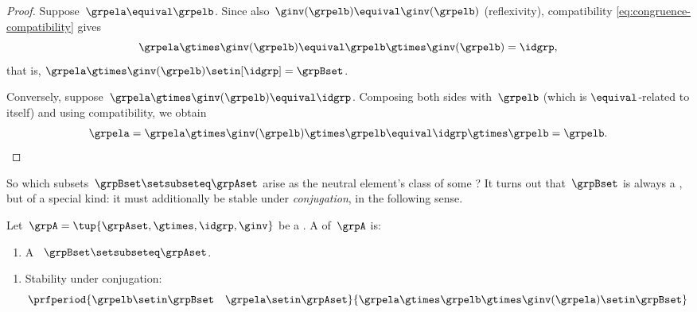 \begin{proof}
    Suppose~$\grpela \equival \grpelb$.
    Since also~$\ginv(\grpelb) \equival \ginv(\grpelb)$ (reflexivity), compatibility \cref{eq:congruence-compatibility} gives
    \begin{equation}
        \grpela \gtimes \ginv(\grpelb) \equival \grpelb \gtimes \ginv(\grpelb) = \idgrp,
    \end{equation}
    that is, $\grpela \gtimes \ginv(\grpelb) \setin [\idgrp] = \grpBset$.

    Conversely, suppose~$\grpela \gtimes \ginv(\grpelb) \equival \idgrp$.
    Composing both sides with~$\grpelb$ (which is $\equival$-related to itself) and using compatibility, we obtain
    \begin{equation}
        \grpela = \grpela \gtimes \ginv(\grpelb) \gtimes \grpelb \equival \idgrp \gtimes \grpelb = \grpelb.
        \qedhere
    \end{equation}
\end{proof}

So which subsets~$\grpBset \setsubseteq \grpAset$ arise as the neutral element's class of some ?
It turns out that~$\grpBset$ is always a , but of a special kind: it must additionally be stable under \emph{conjugation}, in the following sense.

\begin{ctdefinition}
    \label{def:normal-subgroup}
    Let~$\grpA = \tup{\grpAset, \gtimes, \idgrp, \ginv}$ be a .
    A  of~$\grpA$ is:

    \constit

    \begin{enumerate}
        \item A ~$\grpBset \setsubseteq \grpAset$.
    \end{enumerate}

    \condit

    \begin{enumerate}
        \item Stability under conjugation:
              \begin{equation}
                  \label{eq:normality}
                  \prfperiod{
                      \grpelb \setin \grpBset \quad \grpela \setin \grpAset
                  }{
                      \grpela \gtimes \grpelb \gtimes \ginv(\grpela) \setin \grpBset
                  }
              \end{equation}
    \end{enumerate}
\end{ctdefinition}

